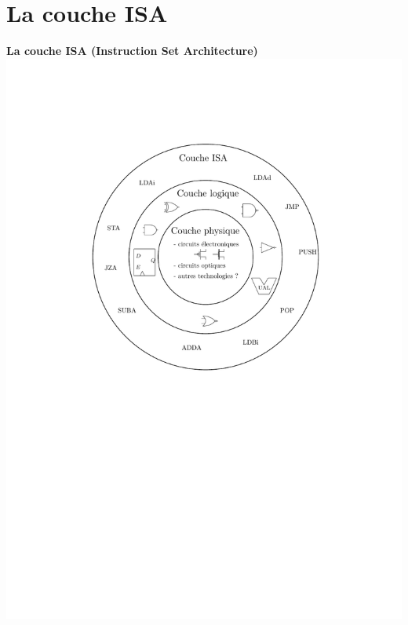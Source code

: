 \documentclass{beamer}
\begin{document}
\section{La couche ISA}

\begin{frame}
\begin{center}
\textbf{La couche ISA (Instruction Set Architecture)}\\
\centering\includegraphics[width=0.4\linewidth]{Figs/couches_architecture.pdf}
\end{center}
\end{frame}
\end{document}
